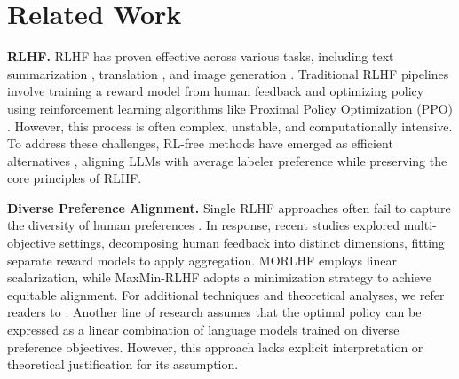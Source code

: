 \section{Related Work}
\textbf{RLHF.} RLHF has proven effective across various tasks, including text summarization \cite{ziegler2020finetuninglanguagemodelshuman, stiennon2022learningsummarizehumanfeedback}, translation \cite{kreutzer2018reliabilitylearnabilityhumanbandit}, and image generation \cite{wu2023humanpreferencescorebetter,lee2023aligningtexttoimagemodelsusing}. Traditional RLHF pipelines involve training a reward model from human feedback and optimizing policy using reinforcement learning algorithms like Proximal Policy Optimization (PPO) \cite{schulman2017proximalpolicyoptimizationalgorithms}. However, this process is often complex, unstable, and computationally intensive. To address these challenges, RL-free methods have emerged as efficient alternatives \cite{chen2024selfplayfinetuningconvertsweak, liu2024statisticalrejectionsamplingimproves, rafailov2024directpreferenceoptimizationlanguage}, aligning LLMs with average labeler preference while preserving the core principles of RLHF.

\noindent 
\textbf{Diverse Preference Alignment.} 
Single RLHF approaches often fail to capture the diversity of human preferences \cite{bakker2022finetuninglanguagemodelsagreement, casper2023openproblemsfundamentallimitations,zhong2024provable}. In response, recent studies explored multi-objective settings, decomposing human feedback into distinct dimensions, fitting separate reward models to apply aggregation. MORLHF \cite{wu2023finegrainedhumanfeedbackgives, zhou2024onepreferencefitsallalignmentmultiobjectivedirect, wang2024arithmeticcontrolllmsdiverse,yang2024rewardsincontextmultiobjectivealignmentfoundation} employs linear scalarization, while MaxMin-RLHF \cite{chakraborty2024maxminrlhfequitablealignmentlarge} adopts a minimization strategy to achieve equitable alignment. For additional techniques and theoretical analyses, we refer readers to \cite{bakker2022finetuninglanguagemodelsagreement, park2024rlhfheterogeneousfeedbackpersonalization, zhong2024provablemultipartyreinforcementlearning}.
Another line of research \cite{chidambaram2024directpreferenceoptimizationunobserved, jang2023personalizedsoupspersonalizedlarge,ji2023beavertailsimprovedsafetyalignment} assumes that the optimal policy can be expressed as a linear combination of language models trained on diverse preference objectives. However, this approach lacks explicit interpretation or theoretical justification for its assumption.

\vspace{-0.12in}